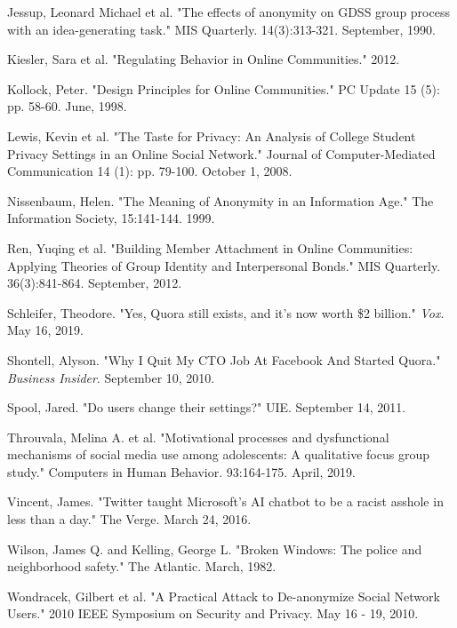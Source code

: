 \documentclass[class=book, crop=false]{standalone}
\begin{document}
Jessup, Leonard Michael et al. "The effects of anonymity on GDSS group process with an idea-generating task." MIS Quarterly. 14(3):313-321. September, 1990.

Kiesler, Sara et al. "Regulating Behavior in Online Communities." 2012.

Kollock, Peter. "Design Principles for Online Communities." PC Update 15 (5): pp. 58-60. June, 1998.

Lewis, Kevin et al. "The Taste for Privacy: An Analysis of College Student Privacy Settings in an Online Social Network." Journal of Computer-Mediated Communication 14 (1): pp. 79-100. October 1, 2008.

Nissenbaum, Helen. "The Meaning of Anonymity in an Information Age." The Information Society, 15:141-144. 1999.

Ren, Yuqing et al. "Building Member Attachment in Online Communities: Applying Theories of Group Identity and Interpersonal Bonds." MIS Quarterly. 36(3):841-864. September, 2012.

Schleifer, Theodore. "Yes, Quora still exists, and it's now worth \$2 billion." \textit{Vox}. May 16, 2019.

Shontell, Alyson. "Why I Quit My CTO Job At Facebook And Started Quora." \textit{Business Insider}. September 10, 2010.

Spool, Jared. "Do users change their settings?" UIE. September 14, 2011.

Throuvala, Melina A. et al. "Motivational processes and dysfunctional mechanisms of social media use among adolescents: A qualitative focus group study." Computers in Human Behavior. 93:164-175. April, 2019.

Vincent, James. "Twitter taught Microsoft's AI chatbot to be a racist asshole in less than a day." The Verge. March 24, 2016. 

Wilson, James Q. and Kelling, George L. "Broken Windows: The police and neighborhood safety." The Atlantic. March, 1982.

Wondracek, Gilbert et al. "A Practical Attack to De-anonymize Social Network Users." 2010 IEEE Symposium on Security and Privacy. May 16 - 19, 2010.
\end{document}
